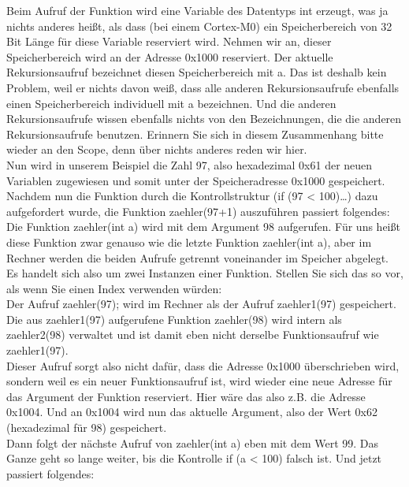 Beim Aufruf der Funktion wird eine Variable des Datentyps int erzeugt, was ja nichts anderes heißt, als dass (bei einem Cortex-M0) ein Speicherbereich von 32 Bit Länge für diese Variable reserviert wird. Nehmen wir an, dieser Speicherbereich wird an der Adresse 0x1000 reserviert. Der aktuelle Rekursionsaufruf bezeichnet diesen Speicherbereich mit a. Das ist deshalb kein Problem, weil er nichts davon weiß, dass alle anderen Rekursionsaufrufe ebenfalls einen Speicherbereich individuell mit a bezeichnen. Und die anderen Rekursionsaufrufe wissen ebenfalls nichts von den Bezeichnungen, die die anderen Rekursionsaufrufe benutzen. Erinnern Sie sich in diesem Zusammenhang bitte wieder an den Scope, denn über nichts anderes reden wir hier.\\

Nun wird in unserem Beispiel die Zahl 97, also hexadezimal 0x61 der neuen Variablen zugewiesen und somit unter der Speicheradresse 0x1000 gespeichert.\\

Nachdem nun die Funktion durch die Kontrollstruktur (if (97 < 100)…) dazu aufgefordert wurde, die Funktion zaehler(97+1) auszuführen passiert folgendes: Die Funktion zaehler(int a) wird mit dem Argument 98 aufgerufen. Für uns heißt diese Funktion zwar genauso wie die letzte Funktion zaehler(int a), aber im Rechner werden die beiden Aufrufe getrennt voneinander im Speicher abgelegt. Es handelt sich also um zwei Instanzen einer Funktion. Stellen Sie sich das so vor, als wenn Sie einen Index verwenden würden:\\

Der Aufruf zaehler(97); wird im Rechner als der Aufruf zaehler1(97) gespeichert.\\

Die aus zaehler1(97) aufgerufene Funktion zaehler(98) wird intern als zaehler2(98) verwaltet und ist damit eben nicht derselbe Funktionsaufruf wie zaehler1(97).\\

Dieser Aufruf sorgt also nicht dafür, dass die Adresse 0x1000 überschrieben wird, sondern weil es ein neuer Funktionsaufruf ist, wird wieder eine neue Adresse für das Argument der Funktion reserviert. Hier wäre das also z.B. die Adresse 0x1004. Und an 0x1004 wird nun das aktuelle Argument, also der Wert 0x62 (hexadezimal für 98) gespeichert.\\

Dann folgt der nächste Aufruf von zaehler(int a) eben mit dem Wert 99. Das Ganze geht so lange weiter, bis die Kontrolle if (a < 100) falsch ist. Und jetzt passiert folgendes:\\

